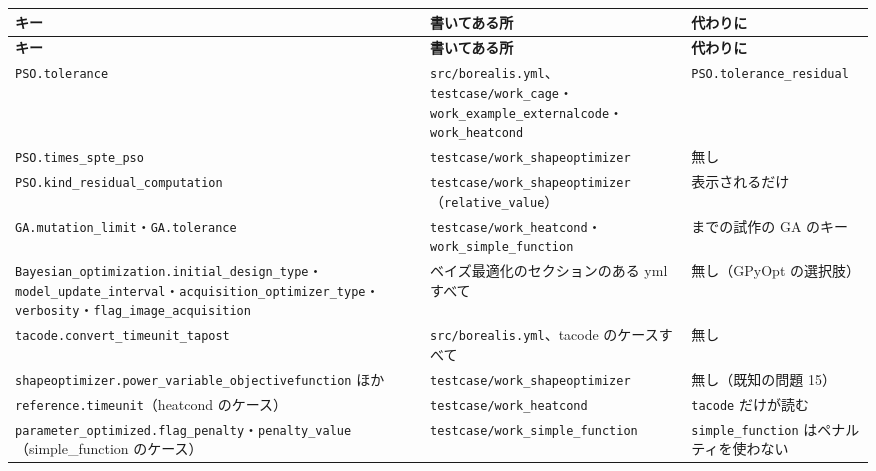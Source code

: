 \begingroup\small
\begin{longtable}{>{\raggedright\arraybackslash}p{}>{\raggedright\arraybackslash}p{}>{\raggedright\arraybackslash}p{}}
\toprule
\textbf{キー} & \textbf{書いてある所} & \textbf{代わりに} \\
\midrule
\endfirsthead
\toprule
\textbf{キー} & \textbf{書いてある所} & \textbf{代わりに} \\
\midrule
\endhead
\bottomrule
\endlastfoot
\texttt{PSO.\allowbreak{}tolerance} & \texttt{src/\allowbreak{}borealis.\allowbreak{}yml}、\texttt{testcase/\allowbreak{}work\_\allowbreak{}cage}・\texttt{work\_\allowbreak{}example\_\allowbreak{}externalcode}・\texttt{work\_\allowbreak{}heatcond} & \texttt{PSO.\allowbreak{}tolerance\_\allowbreak{}residual} \\
\texttt{PSO.\allowbreak{}times\_\allowbreak{}spte\_\allowbreak{}pso} & \texttt{testcase/\allowbreak{}work\_\allowbreak{}shapeoptimizer} & 無し \\
\texttt{PSO.\allowbreak{}kind\_\allowbreak{}residual\_\allowbreak{}computation} & \texttt{testcase/\allowbreak{}work\_\allowbreak{}shapeoptimizer}（\texttt{relative\_\allowbreak{}value}） & 表示されるだけ \\
\texttt{GA.\allowbreak{}mutation\_\allowbreak{}limit}・\texttt{GA.\allowbreak{}tolerance} & \texttt{testcase/\allowbreak{}work\_\allowbreak{}heatcond}・\texttt{work\_\allowbreak{}simple\_\allowbreak{}function} & 1.6 までの試作の GA のキー \\
\texttt{Bayesian\_\allowbreak{}optimization.\allowbreak{}initial\_\allowbreak{}design\_\allowbreak{}type}・\texttt{model\_\allowbreak{}update\_\allowbreak{}interval}・\texttt{acquisition\_\allowbreak{}optimizer\_\allowbreak{}type}・\texttt{verbosity}・\texttt{flag\_\allowbreak{}image\_\allowbreak{}acquisition} & ベイズ最適化のセクションのある yml すべて & 無し（GPyOpt の選択肢） \\
\texttt{tacode.\allowbreak{}convert\_\allowbreak{}timeunit\_\allowbreak{}tapost} & \texttt{src/\allowbreak{}borealis.\allowbreak{}yml}、tacode のケースすべて & 無し \\
\texttt{shapeoptimizer.\allowbreak{}power\_\allowbreak{}variable\_\allowbreak{}objectivefunction} ほか & \texttt{testcase/\allowbreak{}work\_\allowbreak{}shapeoptimizer} & 無し（既知の問題 15） \\
\texttt{reference.\allowbreak{}timeunit}（heatcond のケース） & \texttt{testcase/\allowbreak{}work\_\allowbreak{}heatcond} & \texttt{tacode} だけが読む \\
\texttt{parameter\_\allowbreak{}optimized.\allowbreak{}flag\_\allowbreak{}penalty}・\texttt{penalty\_\allowbreak{}value}（simple\_function のケース） & \texttt{testcase/\allowbreak{}work\_\allowbreak{}simple\_\allowbreak{}function} & \texttt{simple\_\allowbreak{}function} はペナルティを使わない \\
\end{longtable}
\endgroup

